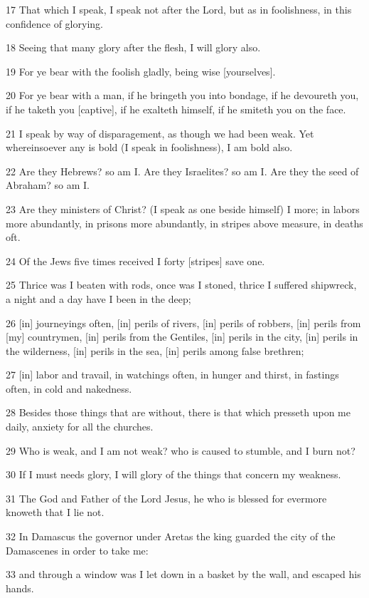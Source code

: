 \par 17 That which I speak, I speak not after the Lord, but as in foolishness, in this confidence of glorying.
\par 18 Seeing that many glory after the flesh, I will glory also.
\par 19 For ye bear with the foolish gladly, being wise [yourselves].
\par 20 For ye bear with a man, if he bringeth you into bondage, if he devoureth you, if he taketh you [captive], if he exalteth himself, if he smiteth you on the face.
\par 21 I speak by way of disparagement, as though we had been weak. Yet whereinsoever any is bold (I speak in foolishness), I am bold also.
\par 22 Are they Hebrews? so am I. Are they Israelites? so am I. Are they the seed of Abraham? so am I.
\par 23 Are they ministers of Christ? (I speak as one beside himself) I more; in labors more abundantly, in prisons more abundantly, in stripes above measure, in deaths oft.
\par 24 Of the Jews five times received I forty [stripes] save one.
\par 25 Thrice was I beaten with rods, once was I stoned, thrice I suffered shipwreck, a night and a day have I been in the deep;
\par 26 [in] journeyings often, [in] perils of rivers, [in] perils of robbers, [in] perils from [my] countrymen, [in] perils from the Gentiles, [in] perils in the city, [in] perils in the wilderness, [in] perils in the sea, [in] perils among false brethren;
\par 27 [in] labor and travail, in watchings often, in hunger and thirst, in fastings often, in cold and nakedness.
\par 28 Besides those things that are without, there is that which presseth upon me daily, anxiety for all the churches.
\par 29 Who is weak, and I am not weak? who is caused to stumble, and I burn not?
\par 30 If I must needs glory, I will glory of the things that concern my weakness.
\par 31 The God and Father of the Lord Jesus, he who is blessed for evermore knoweth that I lie not.
\par 32 In Damascus the governor under Aretas the king guarded the city of the Damascenes in order to take me:
\par 33 and through a window was I let down in a basket by the wall, and escaped his hands.

